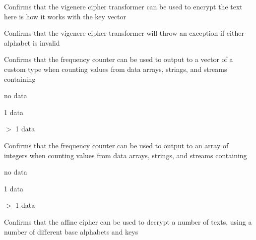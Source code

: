 \begin{DoxyRefList}
\item[\label{test__test000010}%
\hypertarget{test__test000010}{}%
Member \hyperlink{test__vigenere_8cpp_a23e043c8c5848ae0209e71684a992d97}{T\+E\+S\+T\+\_\+\+C\+A\+SE} (\char`\"{}\+Vigenere cipher encrypt\char`\"{})]Confirms that the vigenere cipher transformer can be used to encrypt the text \textquotesingle{}here is how it works\textquotesingle{} with the key \textquotesingle{}vector\textquotesingle{}  
\item[\label{test__test000009}%
\hypertarget{test__test000009}{}%
Member \hyperlink{test__vigenere_8cpp_a578ba21de873916b203248819ff59066}{T\+E\+S\+T\+\_\+\+C\+A\+SE} (\char`\"{}\+Vigenere cipher errors\char`\"{})]Confirms that the vigenere cipher transformer will throw an exception if either alphabet is invalid  
\item[\label{test__test000008}%
\hypertarget{test__test000008}{}%
Member \hyperlink{test__frequencycount_8cpp_a932edc6d645e0946d7fcbb8f4373fc2b}{T\+E\+S\+T\+\_\+\+C\+A\+SE} (\char`\"{}\+Frequency count using vector of custom type output\char`\"{})]Confirms that the frequency counter can be used to output to a vector of a custom type when counting values from data arrays, strings, and streams containing
\begin{DoxyItemize}
\item no data
\item 1 data
\item $>$ 1 data  
\end{DoxyItemize}
\item[\label{test__test000007}%
\hypertarget{test__test000007}{}%
Member \hyperlink{test__frequencycount_8cpp_a8ea251fe2c778db1f45691f74dd1db8a}{T\+E\+S\+T\+\_\+\+C\+A\+SE} (\char`\"{}\+Frequency count using array output\char`\"{})]Confirms that the frequency counter can be used to output to an array of integers when counting values from data arrays, strings, and streams containing
\begin{DoxyItemize}
\item no data
\item 1 data
\item $>$ 1 data  
\end{DoxyItemize}
\item[\label{test__test000006}%
\hypertarget{test__test000006}{}%
Member \hyperlink{test__affine_8cpp_a3bb6d61317ec15e24048f84b6b2a625c}{T\+E\+S\+T\+\_\+\+C\+A\+SE} (\char`\"{}\+Affine cipher decrypt\char`\"{})]Confirms that the affine cipher can be used to decrypt a number of texts, using a number of different base alphabets and keys  

\end{DoxyRefList}
